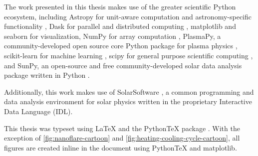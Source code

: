 The work presented in this thesis makes use of the greater scientific Python ecosystem, including Astropy for unit-aware computation and astronomy-specific functionality \citep{the_astropy_collaboration_astropy_2018}, Dask for parallel and distributed computing \citep{rocklin_dask_2015}, matplotlib \citep{hunter_matplotlib_2007} and seaborn \citep{michael_waskom_2018_1313201} for visualization, NumPy for array computation \citep{oliphant_guide_2006}, PlasmaPy, a community-developed open source core Python package for plasma physics \citep{plasmapy_community_2018_1238132}, scikit-learn for machine learning \citep{pedregosa_scikit-learn_2011}, scipy for general purpose scientific computing \citep[e.g. interpolation, curve fitting, special functions][]{jones_scipy_2001}, and SunPy, an open-source and free community-developed solar data analysis package written in Python \citep{sunpy_community_sunpypython_2015}.

Additionally, this work makes use of SolarSoftware \citep[SSW,][]{freeland_data_1998}, a common programming and data analysis environment for solar physics written in the proprietary Interactive Data Language (IDL).

This thesis was typeset using \LaTeX{} and the Python\TeX{} package \citep{poore_pythontex_2015}. With the exception of \autoref{fig:nanoflare-cartoon} and \autoref{fig:heating-cooling-cycle-cartoon}, all figures are created inline in the document using Python\TeX{} and matplotlib.

